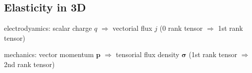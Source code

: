 \subsection{Elasticity in 3D}
	electrodyamics: scalar charge $q$ $\Rightarrow$ vectorial flux $j$ (0 rank tensor $\Rightarrow$ 1st rank tensor)
	
	mechanics: vector momentum $\mathbf{p}$ $\Rightarrow$ tensorial flux density $\mathbf{\sigma}$ (1st rank tensor $\Rightarrow$ 2nd rank tensor)


